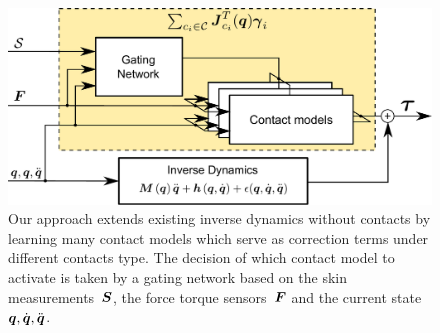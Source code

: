 	\begin{figure}[t]
		\centering
		\includegraphics[width =.58\linewidth]{robertoIROS/fig/diagram_2.pdf}
		\caption{Our approach extends existing inverse dynamics without contacts by learning many contact models which serve as correction terms under different contacts type. The decision of which contact model to activate is taken by a gating network based on the skin measurements~$\mathcal{\boldsymbol{S}}$, the force torque sensors~$\boldsymbol{F}$ and the current state $\boldsymbol q, \dot{\boldsymbol q}, \ddot{\boldsymbol q}$.}
		\label{fig:robIROS_model}
	\end{figure}



